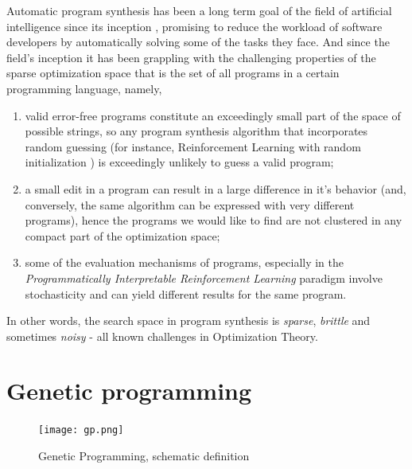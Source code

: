 Automatic program synthesis has been a long term goal of the field of artificial intelligence since its inception \cite{mannaAutomaticProgramSynthesis1971}, promising to reduce the workload of software developers by automatically solving some of the tasks they face.
And since the field's inception it has been grappling with the challenging properties of the sparse optimization space \cite{alurSyntaxguidedSynthesis2013, davidProgramSynthesisChallenges2017} that is the set of all programs in a certain programming language, namely, 
\begin{enumerate}
    \item valid error-free programs constitute an exceedingly small part of the space of possible strings, so any program synthesis algorithm that incorporates random guessing (for instance, Reinforcement Learning with random initialization \cite{suttonReinforcementLearningSecond2018}) is exceedingly unlikely to guess a valid program;
    \item a small edit in a program can result in a large difference in it's behavior (and, conversely, the same algorithm can be expressed with very different programs), hence the programs we would like to find are not clustered in any compact part of the optimization space;
    \item some of the evaluation mechanisms of programs, especially in the \emph{Programmatically Interpretable Reinforcement Learning} paradigm involve stochasticity and can yield different results for the same program.
\end{enumerate}

In other words, the search space in program synthesis is \emph{sparse}, \emph{brittle} and sometimes \emph{noisy} \cite{arnoldNoisyOptimizationEvolution2002} - all known challenges in Optimization Theory.

\newpage
\section{Genetic programming}
\label{sec:gp}

\begin{figure}[H]
    \centering
    \texttt{[image: gp.png]}
    \caption{Genetic Programming, schematic definition}
    \label{fig:gp}
\end{figure}

